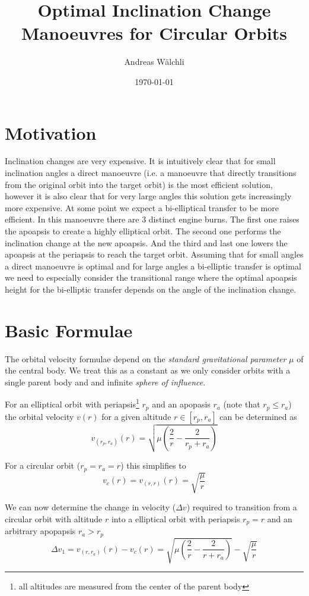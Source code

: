 \documentclass[a4paper, 11pt]{article}
\title{Optimal Inclination Change Manoeuvres for Circular Orbits}
\author{Andreas Wälchli}
\date{\today}
\begin{document}
\maketitle

\section{Motivation}
Inclination changes are very expensive. It is intuitively clear that for small inclination angles a direct manoeuvre (i.e. a manoeuvre that directly transitions from the original orbit into the target orbit) is the most efficient solution, however it is also clear that for very large angles this solution gets increasingly more expensive. At some point we expect a bi-elliptical transfer to be more efficient. In this manoeuvre there are 3 distinct engine burns. The first one raises the apoapsis to create a highly elliptical orbit. The second one performs the inclination change at the new apoapsis. And the third and last one lowers the apoapsis at the periapsis to reach the target orbit. Assuming that for small angles a direct manoeuvre is optimal and for large angles a bi-elliptic transfer is optimal we need to especially consider the transitional range where the optimal apoapsis height for the bi-elliptic transfer depends on the angle of the inclination change.

\section{Basic Formulae}
The orbital velocity formulae depend on the \emph{standard gravitational parameter} $\mu$ of the central body. We treat this as a constant as we only consider orbits with a single parent body and and infinite \emph{sphere of influence}.

For an elliptical orbit with periapsis\footnote{all altitudes are measured from the center of the parent body} $r_p$ and an apopasis $r_a$ (note that $r_p \leq r_a$) the orbital velocity $v(r)$ for a given altitude $r \in [r_p,r_a]$ can be determined as
$$v_{(r_p,r_a)}(r) = \sqrt{\mu\left(\frac{2}{r}-\frac{2}{r_p + r_a}\right)}$$

For a circular orbit ($r_p = r_a = r$) this simplifies to
$$v_c(r) = v_{(r,r)}(r) = \sqrt{\frac{\mu}{r}}$$

We can now determine the change in velocity ($\Delta{}v$) required to transition from a circular orbit with altitude $r$ into a elliptical orbit with periapsis $r_p = r$ and an arbitrary apopapsis $r_a > r_p$
$$\Delta{}v_1 = v_{(r,r_a)}(r) - v_c(r) = \sqrt{\mu\left(\frac{2}{r}-\frac{2}{r + r_a}\right)} - \sqrt{\frac{\mu}{r}}$$
\end{document}
